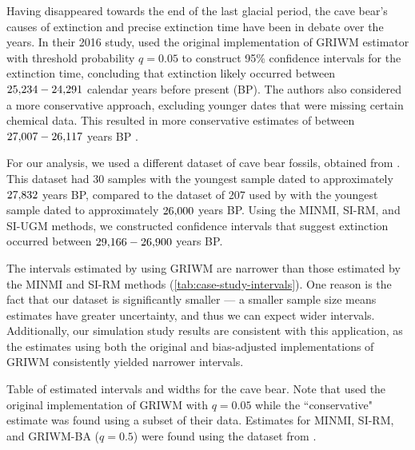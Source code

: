 Having disappeared towards the end of the last glacial period, the cave bear's causes of extinction and precise extinction time have been in debate over the years. In their 2016 study, \citet{Baca2016} used the original implementation of GRIWM estimator with threshold probability $q = 0.05$ to construct 95\% confidence intervals for the extinction time, concluding that extinction likely occurred between $25{\small,}234 - 24{\small,}291$ calendar years before present (BP). The authors also considered a more conservative approach, excluding younger dates that were missing certain chemical data. This resulted in more conservative estimates of between $27{\small,}007 - 26{\small,}117$ years BP \cite{Baca2016}.

For our analysis, we used a different dataset of cave bear fossils, obtained from \citet{Cooper2015}. This dataset had 30 samples with the youngest sample dated to approximately $27{\small,}832$ years BP, compared to the dataset of 207 used by \citet{Baca2016} with the youngest sample dated to approximately $26{\small,}000$ years BP. Using the MINMI, SI-RM, and SI-UGM methods, we constructed confidence intervals that suggest extinction occurred between $29{\small,}166 - 26{\small,}900$ years BP.

The intervals estimated by \citet{Baca2016} using GRIWM are narrower than those estimated by the MINMI and SI-RM methods (\autoref{tab:case-study-intervals}). One reason is the fact that our dataset is significantly smaller --- a smaller sample size means estimates have greater uncertainty, and thus we can expect wider intervals. Additionally, our simulation study results are consistent with this application, as the estimates using both the original and bias-adjusted implementations of GRIWM consistently yielded narrower intervals.
\begin{table}[ht]
    \centering
    \caption{Table of estimated intervals and widths for the cave bear. Note that \citet{Baca2016} used the original implementation of GRIWM with $q=0.05$ while the ``conservative" estimate was found using a subset of their data. Estimates for MINMI, SI-RM, and GRIWM-BA ($q=0.5$) were found using the dataset from \citet{Cooper2015}.}
    
    \label{tab:case-study-intervals}
    \vspace{-4mm}
\end{table}

